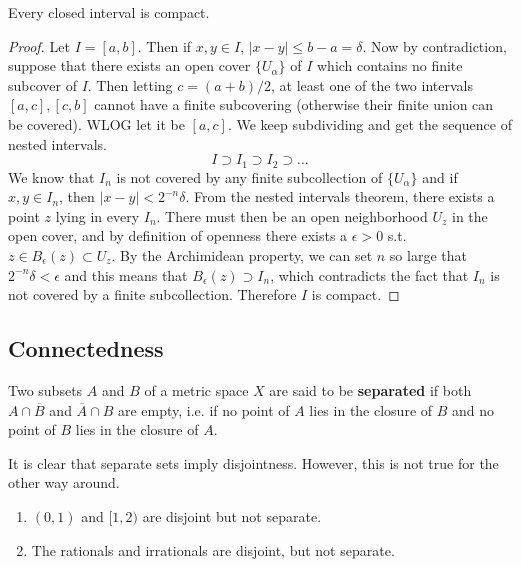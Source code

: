   \begin{corollary}
    Every closed interval is compact. 
  \end{corollary}
  \begin{proof}
    Let $I = [a, b]$. Then if $x, y \in I$, $|x - y| \leq b - a = \delta$. Now by contradiction, suppose that there exists an open cover $\{U_\alpha\}$ of $I$ which contains no finite subcover of $I$. Then letting $c = (a + b)/2$, at least one of the two intervals $[a, c], [c, b]$ cannot have a finite subcovering (otherwise their finite union can be covered). WLOG let it be $[a, c]$. We keep subdividing and get the sequence of nested intervals. 
    \begin{equation}
      I \supset I_1 \supset I_2 \supset \ldots 
    \end{equation}
    We know that $I_n$ is not covered by any finite subcollection of $\{U_\alpha\}$ and if $x, y \in I_n$, then $|x - y| < 2^{-n} \delta$. From the nested intervals theorem, there exists a point $z$ lying in every $I_n$. There must then be an open neighborhood $U_z$ in the open cover, and by definition of openness there exists a $\epsilon > 0$ s.t. $z \in B_\epsilon (z) \subset U_z$. By the Archimidean property, we can set $n$ so large that $2^{-n} \delta < \epsilon$ and this means that $B_\epsilon (z) \supset I_n$, which contradicts the fact that $I_n$ is not covered by a finite subcollection. Therefore $I$ is compact. 
  \end{proof}

\subsection{Connectedness}

  \begin{definition}
    Two subsets $A$ and $B$ of a metric space $X$ are said to be \textbf{separated} if both $A \cap \overline{B}$ and $\overline{A} \cap B$ are empty, i.e. if no point of $A$ lies in the closure of $B$ and no point of $B$ lies in the closure of $A$. 
  \end{definition}

  \begin{example}
    It is clear that separate sets imply disjointness. However, this is not true for the other way around. 
    \begin{enumerate}
      \item $(0, 1)$ and $[1, 2)$ are disjoint but not separate. 
      \item The rationals and irrationals are disjoint, but not separate. 
    \end{enumerate}
  \end{example}

